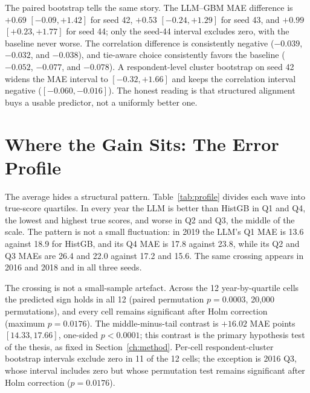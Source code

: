 The paired bootstrap tells the same story. The LLM--GBM MAE difference is
$+0.69$ $[-0.09,+1.42]$ for seed 42, $+0.53$ $[-0.24,+1.29]$ for seed 43, and
$+0.99$ $[+0.23,+1.77]$ for seed 44; only the seed-44 interval excludes zero,
with the baseline never worse. The correlation difference is consistently
negative ($-0.039$, $-0.032$, and $-0.038$), and tie-aware choice consistently
favors the baseline ($-0.052$, $-0.077$, and $-0.078$). A respondent-level
cluster bootstrap on seed 42 widens the MAE interval to $[-0.32,+1.66]$ and
keeps the correlation interval negative ($[-0.060,-0.016]$). The honest reading
is that structured alignment buys a usable predictor, not a uniformly better
one.

\section{Where the Gain Sits: The Error Profile}



The average hides a structural pattern. Table~\ref{tab:profile} divides each
wave into true-score quartiles. In every year the LLM is better than HistGB in
Q1 and Q4, the lowest and highest true scores, and worse in Q2 and Q3, the middle
of the scale. The pattern is not a small fluctuation: in 2019 the LLM's Q1 MAE
is 13.6 against 18.9 for HistGB, and its Q4 MAE is 17.8 against 23.8, while its
Q2 and Q3 MAEs are 26.4 and 22.0 against 17.2 and 15.6. The same crossing
appears in 2016 and 2018 and in all three seeds.

The crossing is not a small-sample artefact. Across the 12 year-by-quartile
cells the predicted sign holds in all 12 (paired permutation $p=0.0003$, 20,000
permutations), and every cell remains significant after Holm correction
(maximum $p=0.0176$). The middle-minus-tail contrast is $+16.02$ MAE
points $[14.33, 17.66]$, one-sided $p<0.0001$; this contrast is the primary
hypothesis test of the thesis, as fixed in Section~\ref{ch:method}. Per-cell
respondent-cluster bootstrap intervals exclude zero in 11 of the 12 cells; the
exception is 2016 Q3, whose interval includes zero but whose permutation test
remains significant after Holm correction ($p=0.0176$).

